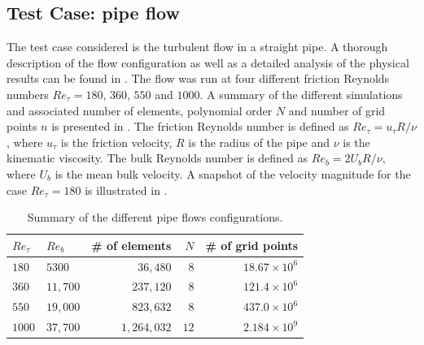 \documentclass{sig-alternate}
\begin{document}
\subsection{Test Case: pipe flow}
\label{sec:pipe}

The test case considered is the turbulent flow in a straight pipe. A thorough description of the flow configuration as well as a detailed analysis of the physical results can be found in \cite{Khoury2013}. The flow was run at four different friction Reynolds numbers $Re_{\tau} = 180$, $360$, $550$ and $1000$. A summary of the different simulations and associated number of elements, polynomial order $N$ and number of grid points $n$ is presented in . The friction Reynolds number is defined as $Re_{\tau} = u_{\tau} R / \nu$, where $u_{\tau}$ is the friction velocity, $R$ is the radius of the pipe and $\nu$ is the kinematic viscosity. The bulk Reynolds number is defined as $Re_{b} = 2 U_b R / \nu$, where $U_b$ is the mean bulk velocity. A snapshot of the velocity magnitude for the case $Re_{\tau} = 180$ is illustrated in .

\begin{table}
\centering
\caption{Summary of the different pipe flows configurations.}
\begin{tabular}{llrrr} 
\hline
$Re_{\tau}$&$Re_{b}$&\# of elements & $N$ & \# of grid points\\ 
\hline
$180$ & $5300$ & $36,480$ & $8$ & $18.67 \times 10^6$\\
$360$ & $11,700$ & $237,120$ & $8$ & $121.4 \times 10^6$\\ 
$550$ & $19,000$ & $823,632$ & $8$ & $437.0 \times 10^6$\\ 
$1000$ & $37,700$ & $1,264,032$ & $12$ & $2.184 \times 10^9$\\
\hline
\end{tabular}
\label{tab:pipe_conf}
\end{table}
\end{document}
